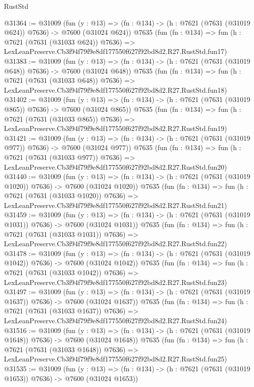 \begin{lexlean}{RustStd}
\begin{coremodule}
@31364 := @31009
    (fun (y : @13) => (fn : @134) -> (h : @7621 (@7631 (@31019 @624)) @7636) -> @7600 (@31024 @624))
    @7635
    (fun (fn : @134) =>
    fun (h : @7621 (@7631 (@31033 @624)) @7636) =>
    LexLeanPreserve.Cb3f94f79f9e8df177550f627f92bd8d2.R27.RustStd.fun17)
@31383 := @31009
    (fun (y : @13) => (fn : @134) -> (h : @7621 (@7631 (@31019 @648)) @7636) -> @7600 (@31024 @648))
    @7635
    (fun (fn : @134) =>
    fun (h : @7621 (@7631 (@31033 @648)) @7636) =>
    LexLeanPreserve.Cb3f94f79f9e8df177550f627f92bd8d2.R27.RustStd.fun18)
@31402 := @31009
    (fun (y : @13) => (fn : @134) -> (h : @7621 (@7631 (@31019 @865)) @7636) -> @7600 (@31024 @865))
    @7635
    (fun (fn : @134) =>
    fun (h : @7621 (@7631 (@31033 @865)) @7636) =>
    LexLeanPreserve.Cb3f94f79f9e8df177550f627f92bd8d2.R27.RustStd.fun19)
@31421 := @31009
    (fun (y : @13) => (fn : @134) -> (h : @7621 (@7631 (@31019 @977)) @7636) -> @7600 (@31024 @977))
    @7635
    (fun (fn : @134) =>
    fun (h : @7621 (@7631 (@31033 @977)) @7636) =>
    LexLeanPreserve.Cb3f94f79f9e8df177550f627f92bd8d2.R27.RustStd.fun20)
@31440 := @31009
    (fun (y : @13) =>
    (fn : @134) -> (h : @7621 (@7631 (@31019 @1020)) @7636) -> @7600 (@31024 @1020))
    @7635
    (fun (fn : @134) =>
    fun (h : @7621 (@7631 (@31033 @1020)) @7636) =>
    LexLeanPreserve.Cb3f94f79f9e8df177550f627f92bd8d2.R27.RustStd.fun21)
@31459 := @31009
    (fun (y : @13) =>
    (fn : @134) -> (h : @7621 (@7631 (@31019 @1031)) @7636) -> @7600 (@31024 @1031))
    @7635
    (fun (fn : @134) =>
    fun (h : @7621 (@7631 (@31033 @1031)) @7636) =>
    LexLeanPreserve.Cb3f94f79f9e8df177550f627f92bd8d2.R27.RustStd.fun22)
@31478 := @31009
    (fun (y : @13) =>
    (fn : @134) -> (h : @7621 (@7631 (@31019 @1042)) @7636) -> @7600 (@31024 @1042))
    @7635
    (fun (fn : @134) =>
    fun (h : @7621 (@7631 (@31033 @1042)) @7636) =>
    LexLeanPreserve.Cb3f94f79f9e8df177550f627f92bd8d2.R27.RustStd.fun23)
@31497 := @31009
    (fun (y : @13) =>
    (fn : @134) -> (h : @7621 (@7631 (@31019 @1637)) @7636) -> @7600 (@31024 @1637))
    @7635
    (fun (fn : @134) =>
    fun (h : @7621 (@7631 (@31033 @1637)) @7636) =>
    LexLeanPreserve.Cb3f94f79f9e8df177550f627f92bd8d2.R27.RustStd.fun24)
@31516 := @31009
    (fun (y : @13) =>
    (fn : @134) -> (h : @7621 (@7631 (@31019 @1648)) @7636) -> @7600 (@31024 @1648))
    @7635
    (fun (fn : @134) =>
    fun (h : @7621 (@7631 (@31033 @1648)) @7636) =>
    LexLeanPreserve.Cb3f94f79f9e8df177550f627f92bd8d2.R27.RustStd.fun25)
@31535 := @31009
    (fun (y : @13) =>
    (fn : @134) -> (h : @7621 (@7631 (@31019 @1653)) @7636) -> @7600 (@31024 @1653))

\end{coremodule}
\end{lexlean}

